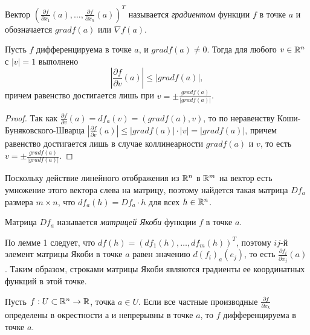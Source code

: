 \begin{definition}
    Вектор $(\frac{\partial f}{\partial x_{1}}(a), \ldots, \frac{\partial f}{\partial x_{n}}(a))^{T}$ называется \textit{градиентом} функции $f$ в точке $a$ и обозначается $grad f(a)$ или $\nabla f(a)$.
\end{definition}

\begin{corollary}
    Пусть $f$ дифференцируема в точке $a$, и $grad f(a) \neq 0$. Тогда для любого $v \in \mathbb{R}^{n}$ с $|v| = 1$ выполнено
    \[\left|\frac{\partial f}{\partial v}(a)\right| \leq |grad f(a)|,\]
    причем равенство достигается лишь при $v = \pm \frac{grad f(a)}{|grad f(a)|}$.
\end{corollary}

\begin{proof}
    Так как $\frac{\partial f}{\partial v}(a) = df_{a}(v) = (grad f(a), v)$, то по неравенству Коши-Буняковского-Шварца $\left|\frac{\partial f}{\partial v}(a)\right| \leq |grad f(a)| \cdot |v| = |grad f(a)|$, причем равенство достигается лишь в случае коллинеарности $grad f(a)$ и $v$, то есть $v = \pm \frac{grad f(a)}{|grad f(a)|}$.
\end{proof}

Поскольку действие линейного отображения из $\mathbb{R}^{n}$ в $\mathbb{R}^{m}$ на вектор есть умножение этого вектора слева на матрицу, поэтому найдется такая матрица $Df_{a}$ размера $m \times n$, что $df_{a}(h) = D f_{a} \cdot h$ для всех $h \in \mathbb{R}^{n}$.

\begin{definition}
    Матрица $Df_{a}$ называется \textit{матрицей Якоби} функции $f$ в точке $a$.
\end{definition}

\begin{note}
    По лемме 1 следует, что $df(h) = (df_{1}(h), \ldots, df_{m}(h))^{T}$, поэтому $ij$-й элемент матрицы Якоби в точке $a$ равен значению $d(f_{i})_{a}(e_{j})$, то есть $\frac{\partial f_{i}}{\partial x_{j}}(a)$. Таким образом, строками матрицы Якоби являются градиенты ее координатных функций в этой точке.
\end{note}

\begin{theorem}
    Пусть $f: U \subset \mathbb{R}^{n} \to \mathbb{R}$, точка $a \in U$. Если все частные производные $\frac{\partial f}{\partial x_{k}}$ определены в окрестности а и непрерывны в точке $a$, то $f$ дифференцируема в точке $a$.
\end{theorem}

